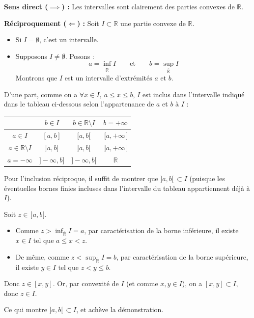 \documentclass[a4paper,11pt]{article}
\newcommand{\R}{\mathbb{R}}
\begin{document}
\begin{demonstration}
\textbf{Sens direct ($\implies$) :} Les intervalles sont clairement des parties convexes de $\R$.

\textbf{Réciproquement ($\Longleftarrow$) :} Soit $I \subset \R$ une partie convexe de $\R$.
\begin{itemize}
    \item Si $I = \emptyset$, c'est un intervalle.
    \item Supposons $I \neq \emptyset$. Posons :
    \[
    a = \inf_{\overline{\R}} I \qquad \text{et} \qquad b = \sup_{\overline{\R}} I
    \]
    Montrons que $I$ est un intervalle d'extrémités $a$ et $b$.
\end{itemize}

D'une part, comme on a $\forall x \in I, \ a \le x \le b$, $I$ est inclus dans l'intervalle indiqué dans le tableau ci-dessous selon l'appartenance de $a$ et $b$ à $I$ :

\begin{center}
\renewcommand{\arraystretch}{1.4}
\begin{tabular}{c|c|c|c}
 & $b \in I$ & $b \in \R \setminus I$ & $b = +\infty$ \\
\hline
$a \in I$ & $[a, b]$ & $[a, b[$ & $[a, +\infty[$ \\
\hline
$a \in \R \setminus I$ & $]a, b]$ & $]a, b[$ & $]a, +\infty[$ \\
\hline
$a = -\infty$ & $]-\infty, b]$ & $]-\infty, b[$ & $\R$ \\
\end{tabular}
\end{center}

Pour l'inclusion réciproque, il suffit de montrer que $]a, b[ \, \subset I$ (puisque les éventuelles bornes finies incluses dans l'intervalle du tableau appartiennent déjà à $I$).

Soit $z \in \, ]a, b[$.
\begin{itemize}
    \item Comme $z > \inf_{\overline{\R}} I = a$, par caractérisation de la borne inférieure, il existe $x \in I$ tel que $a \le x < z$.
    \item De même, comme $z < \sup_{\overline{\R}} I = b$, par caractérisation de la borne supérieure, il existe $y \in I$ tel que $z < y \le b$.
\end{itemize}
Donc $z \in [x, y]$. Or, par convexité de $I$ (et comme $x, y \in I$), on a $[x, y] \subset I$, donc $z \in I$.

Ce qui montre $]a, b[ \, \subset I$, et achève la démonstration.
\end{demonstration}
\end{document}
